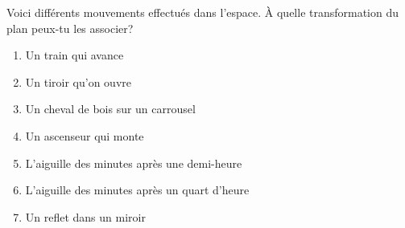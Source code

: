 \documentclass[../../syllabus_1.tex]{subfiles}
\begin{document}
\begin{exercise}
    Voici différents mouvements effectués dans l'espace. À quelle transformation du plan peux-tu les associer? 
    \begin{enumerate}[itemsep=1em]
        \item Un train qui avance
        \item Un tiroir qu'on ouvre
        \item Un cheval de bois sur un carrousel
        \item Un ascenseur qui monte
        \item L'aiguille des minutes après une demi-heure
        \item L'aiguille des minutes après un quart d'heure
        \item Un reflet dans un miroir
    \end{enumerate}
    \vspace{1cm}
\end{exercise}
\end{document}
